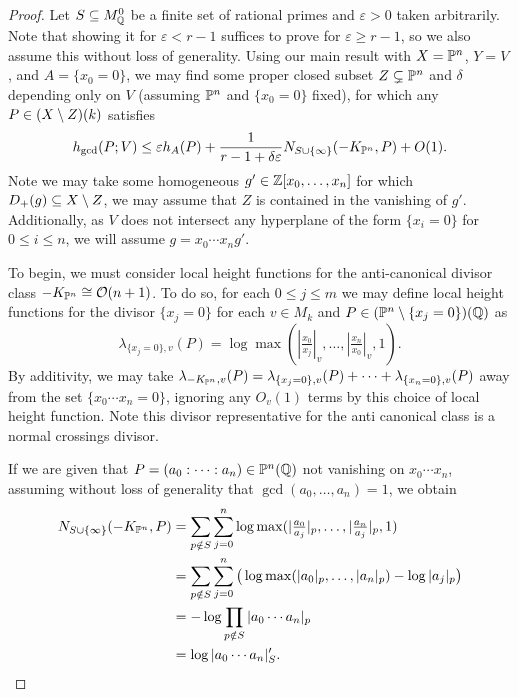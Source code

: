 \begin{proof}
    Let $S \subseteq M_{\mathbb{Q}}^0$ be a finite set of rational primes and $\varepsilon > 0$ taken arbitrarily. 
    Note that showing it for $\varepsilon < r - 1$ suffices to prove for $\varepsilon \geq r - 1$, 
    so we also assume this without loss of generality.
    Using our main result with $X = \mathbb{P}^n$, $Y = V$, and $A = \{x_0 = 0\}$,
    we may find some proper closed subset $Z \subsetneq \mathbb{P}^n$ and $\delta$ depending only on $V$ (assuming $\mathbb{P}^n$ and $\{ x_0 = 0 \}$ fixed),
    for which any $P \in (X \setminus Z)(k)$ satisfies
    \[
        h_{\gcd}(P; V)
        \leq \varepsilon h_A(P)
            + \frac{1}{r - 1 + \delta \varepsilon} N_{S \cup \{\infty\}}(-K_{\mathbb{P}^n}, P) + O(1).
    \]
    Note we may take some homogeneous $g' \in \mathbb{Z}[x_0, \ldots, x_n]$ for which $D_+(g) \subseteq X \setminus Z$,
    we may assume that $Z$ is contained in the vanishing of $g'$.
    Additionally, as $V$ does not intersect any hyperplane of the form $\{x_i = 0\}$ for $0 \leq i \leq n$,
    we will assume $g = x_0 \cdots x_n g'$.

    To begin, we must consider local height functions for the anti-canonical divisor class $-K_{\mathbb{P}^n} \cong \mathcal{O}(n + 1)$.
    To do so, for each $0 \leq j \leq m$ we may define local height functions for the divisor $\{x_j = 0\}$ for each $v \in M_k$ and $P \in (\mathbb{P}^n \setminus \{x_j = 0\})(\mathbb{Q})$ as
    \[
        \lambda_{\{x_j = 0\}, v}(P)
        = \log \max(|\tfrac{x_0}{x_j}|_v, \ldots, |\tfrac{x_n}{x_0}|_v, 1).
    \]
    By additivity, we may take $\lambda_{-K_{\mathbb{P}^n}, v}(P) = \lambda_{\{x_j = 0\}, v}(P) + \cdots + \lambda_{\{x_n = 0\}, v}(P)$ away from the set $\{x_0 \cdots x_n = 0 \}$,
    ignoring any $O_v(1)$ terms by this choice of local height function.
    Note this divisor representative for the anti canonical class is a normal crossings divisor.
    
    If we are given that $P = (a_0 : \cdots : a_n) \in \mathbb{P}^n(\mathbb{Q})$ not vanishing on $x_0 \cdots x_n$,
    assuming without loss of generality that $\gcd(a_0, \ldots, a_n) = 1$,
    we obtain
    \begin{align*}
        N_{S \cup \{\infty\}}(-K_{\mathbb{P}^n}, P)
        & = \sum_{p \notin S}  \sum_{j = 0}^n \log \max(|\tfrac{a_0}{a_j}|_p, \ldots, |\tfrac{a_n}{a_j}|_p, 1) \\
        & = \sum_{p \notin S} \sum_{j = 0}^n \big(
            \log \max(|a_0|_p, \ldots, |a_n|_p) - \log |a_j|_p
        \big) \\
        & = - \log \prod_{p \notin S} |a_0 \cdots a_n|_p \\
        & = \log |a_0 \cdots a_n|_S'.
    \end{align*}


\end{proof}
